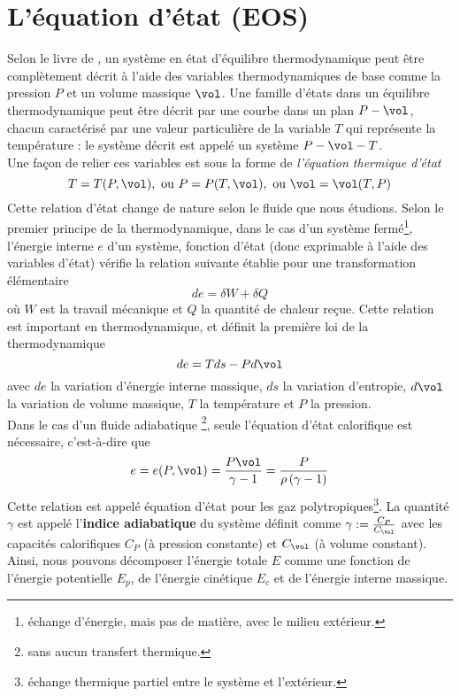 \section{L'équation d'état (EOS)}
Selon le livre de \citet{toro_riemann_2009}, un système en état d'équilibre thermodynamique peut être complètement décrit à l'aide des variables thermodynamiques de base comme la pression $P$ et un volume massique $\vol$. Une famille d'états dans un équilibre thermodynamique peut être décrit par une courbe dans un plan $P-\vol$, chacun caractérisé par une valeur particulière de la variable $T$ qui représente la température : le système décrit est appelé un système $P-\vol-T$.\\
Une façon de relier ces variables est sous la forme de \textit{l'équation thermique d'état}
\begin{equation}
	T = T(P, \vol), \text{ ou } P = P(T, \vol), \text{ ou }\vol = \vol(T, P)
\end{equation}
Cette relation d'état change de nature selon le fluide que nous étudions. 
Selon le premier principe de la thermodynamique, dans le cas d'un système fermé\footnote{échange d'énergie, mais pas de matière, avec le milieu extérieur.}, l'énergie interne $e$ d'un système, fonction d'état (donc exprimable à l'aide des variables d'état) vérifie la relation suivante établie pour une transformation élémentaire
\[ de = \delta W + \delta Q\]
où $W$ est la travail mécanique et $Q$ la quantité de chaleur reçue. Cette relation est important en thermodynamique, et définit la première loi de la thermodynamique 
\begin{equation}
	de = Tds-Pd\vol\label{eq:firstlawthermo}
\end{equation}
avec $de$ la variation d'énergie interne massique, $ds$ la variation d'entropie, $d\vol$ la variation de volume massique, $T$ la température et $P$ la pression.\\
Dans le cas d'un fluide adiabatique \footnote{sans aucun transfert thermique.}, seule l'équation d'état calorifique est nécessaire, c'est-à-dire que 
\[ e = e (P, \vol) = \frac{P\vol}{\gamma - 1} = \frac{P}{\rho\left(\gamma - 1\right)} \]
Cette relation est appelé équation d'état pour les gaz polytropiques\footnote{échange thermique partiel entre le système et l'extérieur.}. La quantité $\gamma$ est appelé l'\textbf{indice adiabatique} du système définit comme $\gamma :=\frac{C_P}{C_\vol}$ avec les capacités calorifiques $C_P$ (à pression constante) et $C_\vol$ (à volume constant).\\ 
Ainsi, nous pouvons décomposer l'énergie totale $E$ comme une  fonction de l'énergie potentielle $E_p$, de l'énergie cinétique $E_c$ et de l'énergie interne massique.\\
